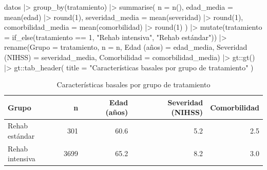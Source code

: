 \documentclass[
  letterpaper,
  DIV=11,
  numbers=noendperiod,
  oneside]{scrreprt}
\newenvironment{Shaded}{\begin{snugshade}}{\end{snugshade}}
\newcommand{\AttributeTok}[1]{\textcolor[rgb]{0.40,0.45,0.13}{#1}}
\newcommand{\DecValTok}[1]{\textcolor[rgb]{0.68,0.00,0.00}{#1}}
\newcommand{\FunctionTok}[1]{\textcolor[rgb]{0.28,0.35,0.67}{#1}}
\newcommand{\NormalTok}[1]{\textcolor[rgb]{0.00,0.23,0.31}{#1}}
\newcommand{\OtherTok}[1]{\textcolor[rgb]{0.00,0.23,0.31}{#1}}
\newcommand{\SpecialCharTok}[1]{\textcolor[rgb]{0.37,0.37,0.37}{#1}}
\newcommand{\StringTok}[1]{\textcolor[rgb]{0.13,0.47,0.30}{#1}}
\begin{document}
\begin{Shaded}
\begin{Highlighting}[]
\NormalTok{datos }\SpecialCharTok{|\textgreater{}}
  \FunctionTok{group\_by}\NormalTok{(tratamiento) }\SpecialCharTok{|\textgreater{}}
  \FunctionTok{summarise}\NormalTok{(}
    \AttributeTok{n              =} \FunctionTok{n}\NormalTok{(),}
    \AttributeTok{edad\_media     =} \FunctionTok{mean}\NormalTok{(edad)        }\SpecialCharTok{|\textgreater{}} \FunctionTok{round}\NormalTok{(}\DecValTok{1}\NormalTok{),}
    \AttributeTok{severidad\_media =} \FunctionTok{mean}\NormalTok{(severidad)  }\SpecialCharTok{|\textgreater{}} \FunctionTok{round}\NormalTok{(}\DecValTok{1}\NormalTok{),}
    \AttributeTok{comorbilidad\_media =} \FunctionTok{mean}\NormalTok{(comorbilidad) }\SpecialCharTok{|\textgreater{}} \FunctionTok{round}\NormalTok{(}\DecValTok{1}\NormalTok{)}
\NormalTok{  ) }\SpecialCharTok{|\textgreater{}}
  \FunctionTok{mutate}\NormalTok{(}\AttributeTok{tratamiento =} \FunctionTok{if\_else}\NormalTok{(tratamiento }\SpecialCharTok{==} \DecValTok{1}\NormalTok{,}
                               \StringTok{"Rehab intensiva"}\NormalTok{, }\StringTok{"Rehab estándar"}\NormalTok{)) }\SpecialCharTok{|\textgreater{}}
  \FunctionTok{rename}\NormalTok{(}\AttributeTok{Grupo =}\NormalTok{ tratamiento,}
         \StringTok{\textasciigrave{}}\AttributeTok{n}\StringTok{\textasciigrave{}} \OtherTok{=}\NormalTok{ n,}
         \StringTok{\textasciigrave{}}\AttributeTok{Edad (años)}\StringTok{\textasciigrave{}} \OtherTok{=}\NormalTok{ edad\_media,}
         \StringTok{\textasciigrave{}}\AttributeTok{Severidad (NIHSS)}\StringTok{\textasciigrave{}} \OtherTok{=}\NormalTok{ severidad\_media,}
         \StringTok{\textasciigrave{}}\AttributeTok{Comorbilidad}\StringTok{\textasciigrave{}} \OtherTok{=}\NormalTok{ comorbilidad\_media) }\SpecialCharTok{|\textgreater{}}
\NormalTok{  gt}\SpecialCharTok{::}\FunctionTok{gt}\NormalTok{() }\SpecialCharTok{|\textgreater{}}
\NormalTok{  gt}\SpecialCharTok{::}\FunctionTok{tab\_header}\NormalTok{(}
    \AttributeTok{title =} \StringTok{"Características basales por grupo de tratamiento"}
\NormalTok{  )}
\end{Highlighting}
\end{Shaded}

\begin{table}
\caption*{
{\large Características basales por grupo de tratamiento}
} 
\fontsize{12.0pt}{14.4pt}\selectfont
\begin{tabular*}{\linewidth}{@{\extracolsep{\fill}}lrrrr}
\toprule
Grupo & n & Edad (años) & Severidad (NIHSS) & Comorbilidad \\ 
\midrule\addlinespace[2.5pt]
Rehab estándar & 301 & 60.6 & 5.2 & 2.5 \\ 
Rehab intensiva & 3699 & 65.2 & 8.2 & 3.0 \\ 
\bottomrule
\end{tabular*}
\end{table}
\end{document}
